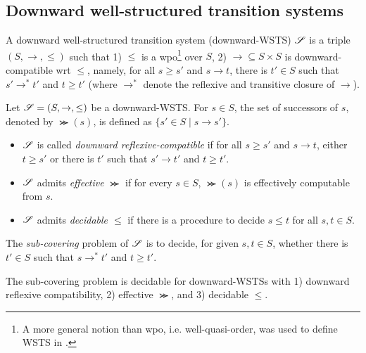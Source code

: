 
\subsection{Downward well-structured transition systems}

\begin{definition}
A downward well-structured transition system (downward-WSTS) $\mathscr{S}$ is a triple $(S, \rightarrow, \le)$ such that 1) $\le$ is a wpo\footnote{A more general notion than wpo, i.e. well-quasi-order, was used to define WSTS in \cite{FS01}. } over $S$, 2) $\rightarrow \subseteq S \times S$ is downward-compatible wrt $\le$, namely, for all $s \ge s'$ and $s \rightarrow t$, there is $t' \in S$ such that $s' \rightarrow^* t'$ and $t \ge t'$ (where $ \rightarrow^*$ denote the reflexive and transitive closure of $\rightarrow$).
\end{definition}


Let $\mathscr{S} = (S, \rightarrow, \le)$ be a downward-WSTS. For $s \in S$, the set of successors of $s$, denoted by $\Succ(s)$, is defined as $\{s' \in S \mid s \rightarrow s'\}$.
\begin{itemize}
\item $\mathscr{S}$ is called \emph{downward reflexive-compatible} if for all $s \ge s'$ and $s \rightarrow t$, either $t \ge s'$ or there is $t'$ such that $s' \rightarrow t'$ and $t \ge t'$.
%
\item $\mathscr{S}$ admits \emph{effective} $\Succ$ if for every $s \in S$, $\Succ(s)$ is effectively computable from $s$.
%
\item $\mathscr{S}$ admits \emph{decidable $\le$} if there is a procedure to decide $s \le t$ for all $s, t \in S$.
%
\end{itemize}

The \emph{sub-covering} problem of $\mathscr{S}$ is to decide, for given $s, t \in S$, whether %
there is $t' \in S$ such that $s \rightarrow^* t'$ and $t \ge t'$.

\begin{theorem}\label{thm-dwsts}
The sub-covering problem is decidable for downward-WSTSs with 1) downward reflexive compatibility,  2) effective $\Succ$, and 3) decidable $\le$.
\end{theorem}



